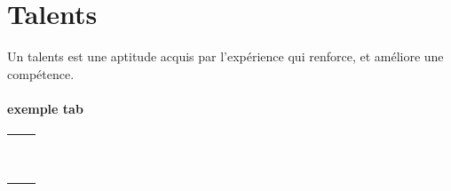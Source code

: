 \part{Talents}
Un talents est une aptitude acquis par l'expérience qui renforce, et améliore une compétence. \\


\subsection*{exemple  tab}
\begin{tabular}{|c|c|}
\hline
 &  \\
\hline
 &  \\
\hline
 &  \\
\hline
 &  \\
\hline
 &  \\
\hline
 &  \\
\hline
 &  \\
\hline
 &  \\
\hline
 &  \\
\hline
 &  \\
\hline
\end{tabular}
